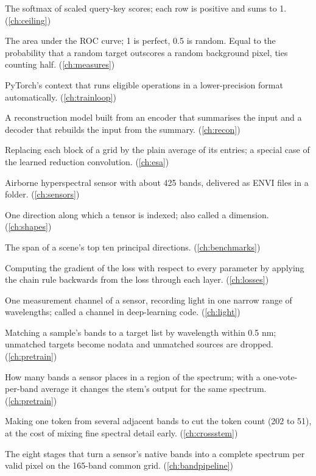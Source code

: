 \begin{description}[style=nextline,leftmargin=1.2em,font=\normalfont\bfseries]
\item[Attention weights] The softmax of scaled query-key scores; each row is positive and sums to 1. (\cref{ch:ceiling})
\item[AUC] The area under the ROC curve; 1 is perfect, 0.5 is random. Equal to the probability that a random target outscores a random background pixel, ties counting half. (\cref{ch:measures})
\item[Autocast] PyTorch's context that runs eligible operations in a lower-precision format automatically. (\cref{ch:trainloop})
\item[Autoencoder] A reconstruction model built from an encoder that summarises the input and a decoder that rebuilds the input from the summary. (\cref{ch:recon})
\item[Average pooling] Replacing each block of a grid by the plain average of its entries; a special case of the learned reduction convolution. (\cref{ch:esa})
\item[AVIRIS-NG] Airborne hyperspectral sensor with about 425 bands, delivered as ENVI files in a folder. (\cref{ch:sensors})
\item[Axis] One direction along which a tensor is indexed; also called a dimension. (\cref{ch:shapes})
\item[Background subspace] The span of a scene's top ten principal directions. (\cref{ch:benchmarks})
\item[Backpropagation] Computing the gradient of the loss with respect to every parameter by applying the chain rule backwards from the loss through each layer. (\cref{ch:losses})
\item[Band] One measurement channel of a sensor, recording light in one narrow range of wavelengths; called a channel in deep-learning code. (\cref{ch:light})
\item[Band alignment] Matching a sample's bands to a target list by wavelength within 0.5 nm; unmatched targets become nodata and unmatched sources are dropped. (\cref{ch:pretrain})
\item[Band density] How many bands a sensor places in a region of the spectrum; with a one-vote-per-band average it changes the stem's output for the same spectrum. (\cref{ch:pretrain})
\item[Band grouping] Making one token from several adjacent bands to cut the token count (202 to 51), at the cost of mixing fine spectral detail early. (\cref{ch:crossstem})
\item[Band pipeline] The eight stages that turn a sensor's native bands into a complete spectrum per valid pixel on the 165-band common grid. (\cref{ch:bandpipeline})

\end{description}
